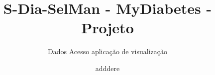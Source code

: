 \documentclass[handout]{beamer}
\title{S-Dia-SelMan - MyDiabetes - Projeto}
\subtitle{Dados Acesso aplicação de visualização}
\author{
adddere
}
\date{}
\institute{\url{mydiabetes@dcc.fc.up.pt}\\\url{http://mydiabetes.dcc.fc.up.py/}}
\begin{document}
\begin{frame}[plain,t]
\titlepage
\end{frame}
\end{document}
